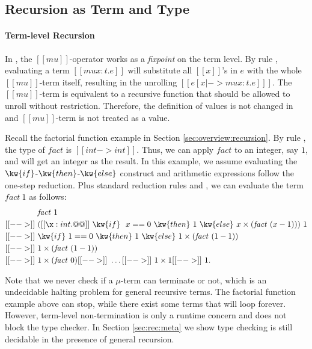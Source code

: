 \subsection{Recursion as Term and Type}
\label{sec:rec:recur}
\paragraph{Term-level Recursion}

In \name, the $[[mu]]$-operator works as a \emph{fixpoint} on the term
level. By rule , evaluating a term $[[mu x:t.e]]$ will
substitute all $[[x]]$'s in $e$ with the whole $[[mu]]$-term itself,
resulting in the unrolling $[[e [x |-> mu x:t.e] ]]$. The
$[[mu]]$-term is equivalent to a recursive function that should be
allowed to unroll without restriction. Therefore, the definition of
values is not changed in \name and $[[mu]]$-term is not treated as a
value. 

Recall the factorial function example in Section
\ref{sec:overview:recursion}.
By rule , the type of $\mathit{fact}$ is $[[int ->
    int]]$. Thus, we can apply $\mathit{fact}$ to an integer, say $1$,
and will get an integer as the result. In this example, we assume
evaluating the $\kw{if}$-$\kw{then}$-$\kw{else}$ construct and 
arithmetic expressions follow the one-step
reduction. Plus standard reduction rules  and
, we can evaluate the term $\mathit{fact}~1$ as
follows:
\begin{align*}
    &\mathit{fact}~1 \\ [[-->]]~& ([[\x : int . @@]]~\kw{if}~
  ~x==0~\kw{then}~1~\kw{else}~x \times (\mathit{fact}~(x - 1)))~1
  \\ [[-->]]~ & \kw{if}~1==0~\kw{then}~1~\kw{else}~1 \times
  (\mathit{fact}~(1 - 1)) \\ [[-->]]~& 1 \times (\mathit{fact}~(1-1))
  \\ [[-->]]~& 1 \times (\mathit{fact}~0) [[-->]]~ \dots [[-->]]~ 1 \times
  1 [[-->]]~ 1. 
\end{align*}

Note that we never check if a $\mu$-term can terminate or not, which
is an undecidable halting problem for general recursive terms. The
factorial function example above can stop, while there exist some
terms that will loop forever. However, term-level non-termination is
only a runtime concern and does not block the type checker. In Section
\ref{sec:rec:meta} we show type checking \name is still decidable
in the presence of general recursion.

